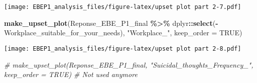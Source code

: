 \documentclass[
]{article}
\newenvironment{Shaded}{\begin{snugshade}}{\end{snugshade}}
\newcommand{\AttributeTok}[1]{\textcolor[rgb]{0.13,0.29,0.53}{#1}}
\newcommand{\CommentTok}[1]{\textcolor[rgb]{0.56,0.35,0.01}{\textit{#1}}}
\newcommand{\ConstantTok}[1]{\textcolor[rgb]{0.56,0.35,0.01}{#1}}
\newcommand{\FunctionTok}[1]{\textcolor[rgb]{0.13,0.29,0.53}{\textbf{#1}}}
\newcommand{\NormalTok}[1]{#1}
\newcommand{\SpecialCharTok}[1]{\textcolor[rgb]{0.81,0.36,0.00}{\textbf{#1}}}
\newcommand{\StringTok}[1]{\textcolor[rgb]{0.31,0.60,0.02}{#1}}
\begin{document}
\texttt{[image: EBEP1\_analysis\_files/figure-latex/upset plot part 2-7.pdf]}

\begin{Shaded}
\begin{Highlighting}[]
\FunctionTok{make\_upset\_plot}\NormalTok{(Reponse\_EBE\_P1\_final }\SpecialCharTok{\%\textgreater{}\%}
\NormalTok{                  dplyr}\SpecialCharTok{::}\FunctionTok{select}\NormalTok{(}\SpecialCharTok{{-}}\NormalTok{Workplace\_suitable\_for\_your\_needs), }\StringTok{"Workplace\_"}\NormalTok{, }\AttributeTok{keep\_order =} \ConstantTok{TRUE}\NormalTok{) }
\end{Highlighting}
\end{Shaded}

\texttt{[image: EBEP1\_analysis\_files/figure-latex/upset plot part 2-8.pdf]}

\begin{Shaded}
\begin{Highlighting}[]
\CommentTok{\# make\_upset\_plot(Reponse\_EBE\_P1\_final, "Suicidal\_thoughts\_Frequency\_", keep\_order = TRUE) }
\CommentTok{\#  Not used anymore}
\end{Highlighting}
\end{Shaded}
\end{document}
